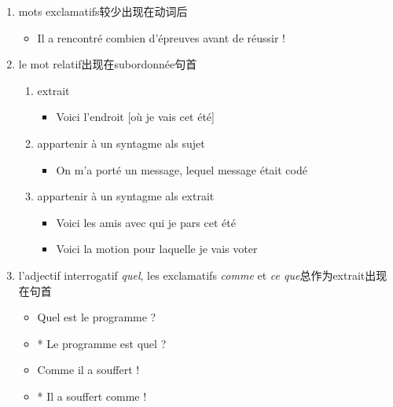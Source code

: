 \documentclass[UTF8]{report}
\begin{document}
\begin{enumerate}
\begin{enumerate}
\begin{itemize}
        \end{itemize}
    \end{enumerate}
    \item mots exclamatifs较少出现在动词后
    \begin{itemize}
        \item Il a rencontré combien d’épreuves avant de réussir !
    \end{itemize}
    \item le mot relatif出现在subordonnée句首
    \begin{enumerate}
        \item extrait
        \begin{itemize}
            \item Voici l’endroit [où je vais cet été]
        \end{itemize}
        \item appartenir à un syntagme als sujet
        \begin{itemize}
            \item On m’a porté un message, lequel message était codé
        \end{itemize}
        \item appartenir à un syntagme als extrait
        \begin{itemize}
            \item Voici les amis avec qui je pars cet été
            \item Voici la motion pour laquelle je vais voter
        \end{itemize}
    \end{enumerate}
    \item l’adjectif interrogatif \textit{quel},  les exclamatifs \textit{comme} et \textit{ce que}总作为extrait出现在句首
    \begin{itemize}
        \item Quel est le programme ?
        \item * Le programme est quel ?
        \item Comme il a souffert !
        \item * Il a souffert comme !
    \end{itemize}
\end{enumerate}
\end{document}
